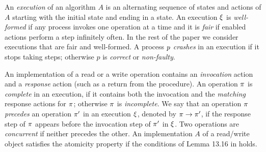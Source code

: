 %

An \textit{execution} of an algorithm $A$  is an alternating sequence of states
and actions of $A$ starting with the initial state and ending in a state. 
An execution $\EX$ is \textit{well-formed} if any process invokes one operation
at a time and it is \textit{fair} if enabled actions perform a step infinitely often. In the rest of the paper 
we consider executions that are fair and well-formed. A process
$p$ \textit{crashes} in an execution if it stops taking steps; otherwise $p$ is \textit{correct} or \textit{non-faulty}.


An implementation of a read or a write operation contains an \textit{invocation} action  and a \textit{response} action (such as a
	return from the procedure). An operation $\pi$ is \textit{complete} in an execution, if it
	contains both the invocation and the \textit{matching} response actions for $\pi$; otherwise $\pi$
	is \textit{incomplete}. 
	We say that an operation $\pi$ \textit{precedes} an operation $\pi'$ in an execution $\EX$,
	denoted by $\pi\rightarrow\pi'$, if the response step of $\pi$ appears before the invocation
	step of $\pi'$ in $\EX$. Two operations are \textit{concurrent} if neither precedes the other.
	An implementation $A$ of a read/write object satisfies the atomicity property
	if the conditions of Lemma 13.16 in  \cite{Lynch1996} holds. 
	

